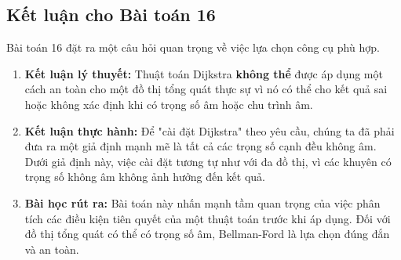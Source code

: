 \documentclass[a4paper,12pt]{article}
\begin{document}
\subsection{Kết luận cho Bài toán 16}
Bài toán 16 đặt ra một câu hỏi quan trọng về việc lựa chọn công cụ phù hợp.
\begin{enumerate}
    \item \textbf{Kết luận lý thuyết:} Thuật toán Dijkstra \textbf{không thể} được áp dụng một cách an toàn cho một đồ thị tổng quát thực sự vì nó có thể cho kết quả sai hoặc không xác định khi có trọng số âm hoặc chu trình âm.
    \item \textbf{Kết luận thực hành:} Để "cài đặt Dijkstra" theo yêu cầu, chúng ta đã phải đưa ra một giả định mạnh mẽ là tất cả các trọng số cạnh đều không âm. Dưới giả định này, việc cài đặt tương tự như với đa đồ thị, vì các khuyên có trọng số không âm không ảnh hưởng đến kết quả.
    \item \textbf{Bài học rút ra:} Bài toán này nhấn mạnh tầm quan trọng của việc phân tích các điều kiện tiên quyết của một thuật toán trước khi áp dụng. Đối với đồ thị tổng quát có thể có trọng số âm, Bellman-Ford là lựa chọn đúng đắn và an toàn.
\end{enumerate}
\end{document}
